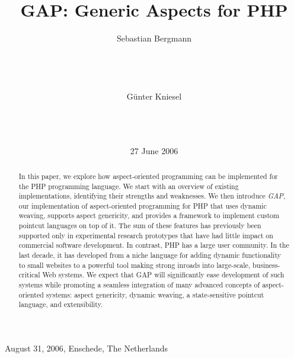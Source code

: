 \documentclass{acm_proc_article-sp}
\begin{document}
%
%
%
%
%
{August 31, 2006, Enschede, The Netherlands
}



\title{GAP: Generic Aspects for PHP}
\date{27 June 2006}

\author{
\alignauthor Sebastian Bergmann\\
       \\
       \\
       \\
       \\
\alignauthor G{\"u}nter Kniesel\\
       \\
       \\
       \\
}

\maketitle

\begin{abstract}
In this paper, we explore how aspect-oriented programming can be
implemented for the PHP programming language. We start with an
overview of existing implementations, identifying their strengths
and weaknesses. We then introduce \emph{GAP}, our implementation
of aspect-oriented programming for PHP that uses dynamic weaving,
supports aspect genericity, and provides a framework to implement
custom pointcut languages on top of it. The sum of these features
has previously been supported only in experimental research
prototypes that have had little impact on commercial software
development. In contrast, PHP has a large user community. In the
last decade, it has developed from a niche language for adding
dynamic functionality to small websites to a powerful tool making
strong inroads into large-scale, business-critical Web systems.
We expect that GAP will significantly ease development of such
systems while promoting a seamless integration of many advanced
concepts of aspect-oriented systems: aspect genericity, dynamic
weaving, a state-sensitive pointcut language, and extensibility.
\end{abstract}
\end{document}
